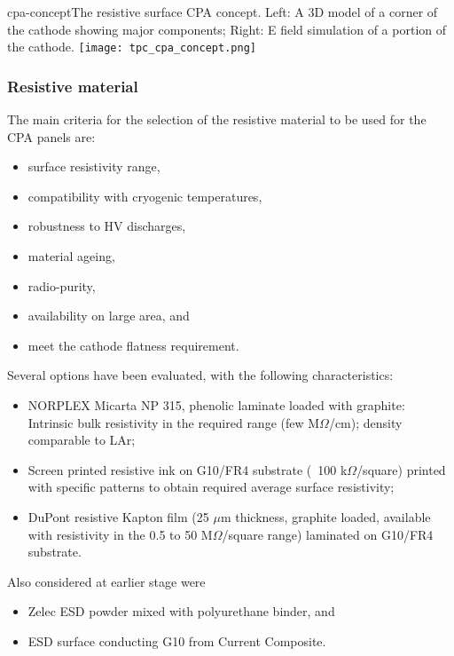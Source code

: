 \begin{cdrfigure}{cpa-concept}{The resistive surface CPA concept. 
 Left: A 3D model of a corner of the cathode showing major components;  Right: E field simulation of a portion of the cathode.} 
\texttt{[image: tpc\_cpa\_concept.png]}
\end{cdrfigure}


\subsubsection{Resistive material}

The main criteria for the selection of the resistive material to be used for the CPA panels are: 
\begin{itemize}	
\item surface resistivity range,
\item compatibility with cryogenic temperatures,
\item robustness to HV discharges, 
\item material ageing,
\item radio-purity,
\item availability on large area, and 
\item meet the cathode flatness requirement. 
\end{itemize}

Several options have been evaluated, with the following characteristics:
\begin{itemize}	
\item NORPLEX Micarta NP 315, phenolic laminate loaded with graphite: Intrinsic bulk resistivity in the required range (few M$\Omega$/cm); density comparable to LAr;
\item Screen printed resistive ink on G10/FR4 substrate (~100 k$\Omega$/square) printed with specific patterns to obtain required average surface resistivity;
\item DuPont resistive Kapton film  (25 $\mu$m thickness, graphite loaded, available with resistivity in the 0.5 to 50 M$\Omega$/square range) laminated on G10/FR4 substrate.
\end{itemize}
Also considered at earlier stage were
\begin{itemize}	
\item Zelec ESD powder mixed with polyurethane binder, and
\item ESD surface conducting G10 from Current Composite.
\end{itemize}

